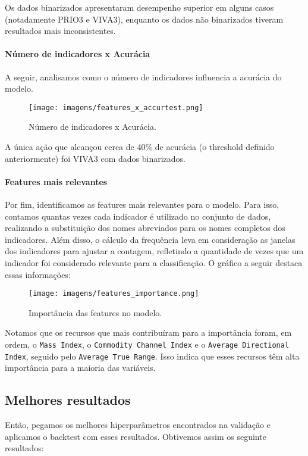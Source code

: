 \documentclass{article}
\begin{document}
Os dados binarizados apresentaram desempenho superior em alguns casos (notadamente PRIO3 e VIVA3), enquanto os dados não binarizados tiveram resultados mais inconsistentes.

\paragraph{Número de indicadores x Acurácia}
A seguir, analisamos como o número de indicadores influencia a acurácia do modelo.

\begin{figure}[H]
    \centering
    \texttt{[image: imagens/features\_x\_accurtest.png]}
    \caption{Número de indicadores x Acurácia.}
    \label{fig:features-acuracia}
\end{figure}

A única ação que alcançou cerca de 40\% de acurácia (o threshold definido anteriormente) foi VIVA3 com dados binarizados.

\paragraph{Features mais relevantes}
Por fim, identificamos as features mais relevantes para o modelo. Para isso, contamos quantas vezes cada indicador é utilizado no conjunto de dados, realizando a substituição dos nomes abreviados para os nomes completos dos indicadores. Além disso, o cálculo da frequência leva em consideração as janelas dos indicadores para ajustar a contagem, refletindo a quantidade de vezes que um indicador foi considerado relevante para a classificação. O gráfico a seguir destaca essas informações:

\begin{figure}[H]
    \centering
    \texttt{[image: imagens/features\_importance.png]}
    \caption{Importância das features no modelo.}
    \label{fig:features-importance}
\end{figure}

Notamos que os recursos que mais contribuíram para a importância foram, em ordem, o \texttt{Mass Index}, o \texttt{Commodity Channel Index} e o \texttt{Average Directional Index}, seguido pelo \texttt{Average True Range}. Isso indica que esses recursos têm alta importância para a maioria das variáveis.


\subsection{Melhores resultados}
Então, pegamos os melhores hiperparâmetros encontrados na validação e aplicamos o backtest com esses resultados. Obtivemos assim os seguinte resultados:
\end{document}
